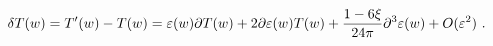 \begin{equation}\label{2.31}
\delta T(w)=T'(w)-T(w)= \varepsilon (w) \partial T(w)+
2\partial\varepsilon(w) T(w) +{1-6\xi \over 24\pi}
\partial^3\varepsilon(w) +O(\varepsilon^2)
~.
\end{equation}

